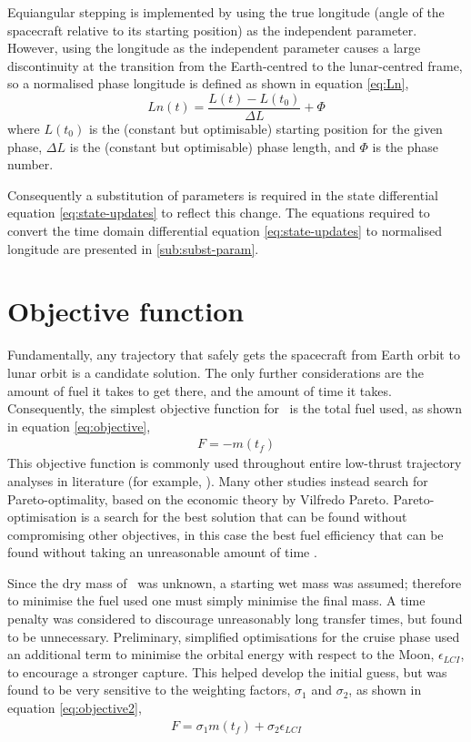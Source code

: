 Equiangular stepping is implemented by using the true longitude (angle of the spacecraft relative to its starting position) as the independent parameter. However, using the longitude as the independent parameter causes a large discontinuity at the transition from the Earth-centred to the lunar-centred frame, so a normalised phase longitude is defined as shown in equation \eqref{eq:Ln},
\begin{equation}
Ln(t) = \frac{L(t)-L(t_0)}{\Delta L}+\Phi \label{eq:Ln}
\end{equation}
where $L(t_0)$ is the (constant but optimisable) starting position for the given phase, $\Delta L$ is the (constant but optimisable) phase length, and $\Phi$ is the phase number. 

Consequently a substitution of parameters is required in the state differential equation \eqref{eq:state-updates} to reflect this change. The equations required to convert the time domain differential equation \eqref{eq:state-updates} to normalised longitude are presented in \autoref{sub:subst-param}.

\section{Objective function} \label{sec:Objective-function}

Fundamentally, any trajectory that safely gets the spacecraft from Earth orbit to lunar orbit is a candidate solution. The only further considerations are the amount of fuel it takes to get there, and the amount of time it takes. Consequently, the simplest objective function for \BW\ is the total fuel used, as shown in equation \eqref{eq:objective},
\begin{gather}
F = -m(t_f) \label{eq:objective}
\end{gather}
 This objective function is commonly used throughout entire low-thrust trajectory analyses in literature (for example, \cite{Ichimura2008}). Many other studies instead search for Pareto-optimality, based on the economic theory by Vilfredo Pareto. Pareto-optimisation is a search for the best solution that can be found without compromising other objectives, in this case the best fuel efficiency that can be found without taking an unreasonable amount of time \parencite{Lee2005, Coverstone2000}.  

Since the dry mass of \BW\ was unknown, a starting wet mass was assumed; therefore to minimise the fuel used one must simply minimise the final mass. A time penalty was considered to discourage unreasonably long transfer times, but found to be unnecessary. Preliminary, simplified optimisations for the cruise phase used an additional term to minimise the orbital energy with respect to the Moon, $\epsilon_{LCI}$, to encourage a stronger capture. This helped develop the initial guess, but was found to be very sensitive to the weighting factors, $\sigma_1$ and $\sigma_2$, as shown in equation \eqref{eq:objective2},
\begin{gather}
F = \sigma_1m(t_f)+\sigma_2\epsilon_{LCI} \label{eq:objective2}
\end{gather}
 
